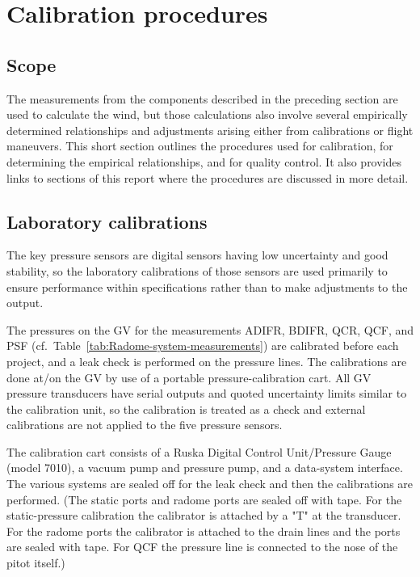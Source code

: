 \documentclass[12pt,twoside,english]{article}\usepackage[]{graphicx}\usepackage[]{color}
\let\stdsection\section
\renewcommand{\section}{\newpage\stdsection}
\let\OrgIndex\index
\renewcommand*{\index}[1]{\OrgIndex{#1}}
\begin{document}
\section{Calibration procedures\label{sec:CalProcedures}}

\subsection{Scope}

The measurements from the components described in the preceding section are used to calculate the wind, but those calculations also involve several empirically determined relationships and adjustments arising either from calibrations or flight maneuvers. This short section outlines the procedures used for calibration, for determining the empirical relationships, and for quality control. It also provides links to sections of this report where the procedures are discussed in more detail.

\subsection{Laboratory calibrations}

The key pressure sensors are digital sensors having low uncertainty and good stability, so the laboratory calibrations of those sensors are used primarily to ensure performance within specifications rather than to make adjustments to the output. 

The pressures on the GV for the measurements ADIFR, BDIFR, QCR, QCF, and PSF (cf.~Table~\ref{tab:Radome-system-measurements}) are calibrated before each project, and a leak check is performed on the pressure lines. The calibrations are done at/on the GV by use of a portable pressure-calibration cart. All GV pressure transducers have serial outputs and quoted uncertainty limits similar to the calibration unit, so the calibration is treated as a check and external calibrations are not applied to the five pressure sensors.  

The calibration cart consists of a Ruska Digital Control Unit/Pressure Gauge (model 7010), a vacuum pump and pressure pump, and a data-system interface. The various systems are sealed off for the leak check and then the calibrations are performed. (The static ports and radome ports are sealed off with tape. For the static-pressure calibration the calibrator is attached by a "T" at the transducer. For the radome ports the calibrator is attached to the drain lines and the ports are sealed with tape. For QCF the pressure line is connected to the nose of the pitot itself.)
\end{document}
